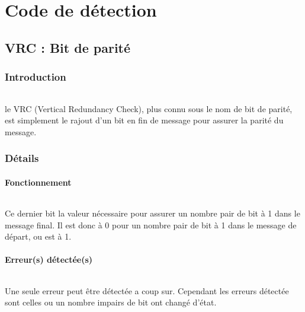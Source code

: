 \part{Code de détection}


    \chapter{VRC : Bit de parité}

        \section{Introduction}

            \paragraph{}
                le VRC (Vertical Redundancy Check), plus connu sous le nom de bit de parité,
                est simplement le rajout d'un bit en fin de message
                pour assurer la parité du message.

        \newpage

        \section{Détails}

            \subsection{Fonctionnement}

                \paragraph{}
                    Ce dernier bit la valeur nécessaire pour assurer un nombre pair de bit à 1 dans le message final.
                    Il est donc à 0 pour un nombre pair de bit à 1 dans le message de départ, ou est à 1.

            \subsection{Erreur(s) détectée(s)}

                \paragraph{}
                    Une seule erreur peut être détectée a coup sur.
                    Cependant les erreurs détectée sont celles ou un nombre impairs de bit ont changé d'état.

